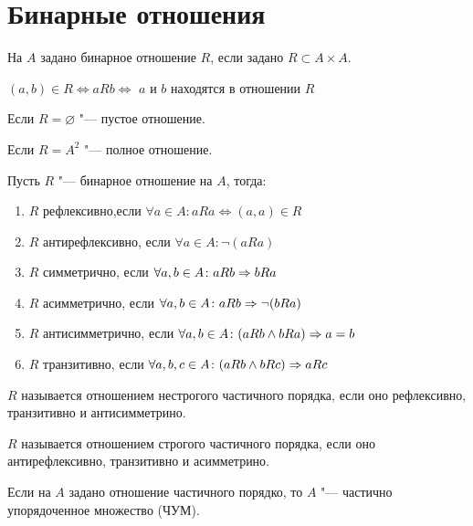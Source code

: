﻿\section{Бинарные отношения}
\begin{Def}
На $A$ задано бинарное отношение $R$, если задано $R \subset A \times A$.

$(a, b) \in R \iff a R b \iff$ $a$ и $b$ находятся в отношении $R$

Если $R = \varnothing$ "--- пустое отношение.

Если $R = A^2$ "--- полное отношение.
\end{Def}

\begin{Def}
Пусть $R$ "--- бинарное отношение на $A$, тогда:
\begin{enumerate}
\item $R$ рефлексивно,если $\forall a \in A \colon aRa \iff (a, a)\in R$
\item $R$ антирефлексивно, если $\forall a \in A \colon \neg (aRa)$
\item $R$ симметрично, если $\forall a, b \in A \colon aRb \Rightarrow bRa$
\item $R$ асимметрично, если $\forall a, b \in A \colon aRb \Rightarrow \neg(bRa)$
\item $R$ антисимметрично, если $\forall a, b \in A \colon (aRb \wedge bRa) \Rightarrow a = b$
\item $R$ транзитивно, если  $\forall a, b, c \in A \colon (aRb \wedge bRc) \Rightarrow aRc$
\end{enumerate}
\end{Def}

\begin{Def}
$R$ называется отношением нестрогого частичного порядка, если оно рефлексивно, транзитивно и антисимметрино. 
\end{Def}
\begin{Def}
$R$ называется отношением строгого частичного порядка, если оно антирефлексивно, транзитивно и асимметрино. 
\end{Def}

Если на $A$ задано отношение частичного порядко, то $A$ "--- частично упорядоченное множество (ЧУМ).
